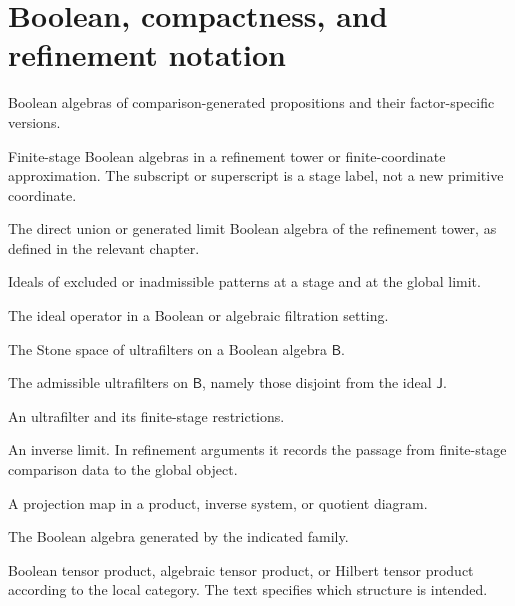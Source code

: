 \section*{Boolean, compactness, and refinement notation}
\begin{description}[leftmargin=3.6cm,style=nextline]
\item[\(\mathsf B\), \(\mathsf B_A\), \(\mathsf B_B\)]
Boolean algebras of comparison-generated propositions and their
factor-specific versions.
\item[\(\mathsf B_k\), \(\mathsf B^{(n)}\)]
Finite-stage Boolean algebras in a refinement tower or finite-coordinate
approximation.  The subscript or superscript is a stage label, not a
new primitive coordinate.
\item[\(\mathsf B_\infty\)]
The direct union or generated limit Boolean algebra of the refinement
tower, as defined in the relevant chapter.
\item[\(\mathsf J\), \(\mathsf J_k\), \(\mathsf J_\infty\)]
Ideals of excluded or inadmissible patterns at a stage and at the
global limit.
\item[\(\Idl\)]
The ideal operator in a Boolean or algebraic filtration setting.
\item[\(\UF(\mathsf B)\)]
The Stone space of ultrafilters on a Boolean algebra \(\mathsf B\).
\item[\(\UF(\mathsf B;\mathsf J)\)]
The admissible ultrafilters on \(\mathsf B\), namely those disjoint from
the ideal \(\mathsf J\).
\item[\(\mathfrak u\), \(\mathfrak u_k\)]
An ultrafilter and its finite-stage restrictions.
\item[\(\varprojlim\)]
An inverse limit.  In refinement arguments it records the passage from
finite-stage comparison data to the global object.
\item[\(\pr\)]
A projection map in a product, inverse system, or quotient diagram.
\item[\(\Bool(\cdot)\)]
The Boolean algebra generated by the indicated family.
\item[\(\otimes\)]
Boolean tensor product, algebraic tensor product, or Hilbert tensor
product according to the local category.  The text specifies which
structure is intended.
\end{description}

